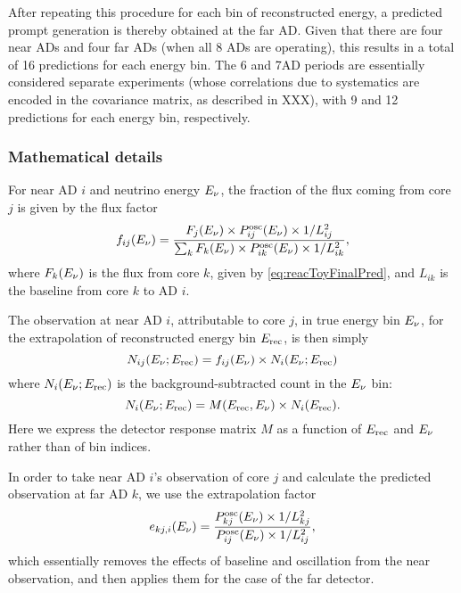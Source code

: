 \documentclass[../thesis.tex]{subfiles}
\begin{document}
After repeating this procedure for each bin of reconstructed energy, a predicted prompt generation is thereby obtained at the far AD. Given that there are four near ADs and four far ADs (when all 8 ADs are operating), this results in a total of 16 predictions for each energy bin. The 6 and 7AD periods are essentially considered separate experiments (whose correlations due to systematics are encoded in the covariance matrix, as described in XXX), with 9 and 12 predictions for each energy bin, respectively.

\subsubsection{Mathematical details}

For near AD $i$ and neutrino energy $E_\mathrm{\nu}$, the fraction of the flux coming from core $j$ is given by the flux factor
\begin{equation*}
  f_{ij}(E_\mathrm{\nu}) = \frac{F_j(E_\mathrm{\nu}) \times P^{\mathrm{osc}}_{ij}(E_\mathrm{\nu}) \times 1/L^2_{ij}}
  {\sum_k F_k(E_\mathrm{\nu}) \times P^{\mathrm{osc}}_{ik}(E_\mathrm{\nu}) \times 1/L^2_{ik}},
\end{equation*}
where $F_k(E_\mathrm{\nu})$ is the flux from core $k$, given by \autoref{eq:reacToyFinalPred}, and $L_{ik}$ is the baseline from core $k$ to AD $i$.

The observation at near AD $i$, attributable to core $j$, in true energy bin $E_\mathrm{\nu}$, for the extrapolation of reconstructed energy bin $E_\mathrm{rec}$, is then simply
\begin{equation*}
  N_{ij}(E_\mathrm{\nu}; E_\mathrm{rec}) = f_{ij}(E_\mathrm{\nu}) \times N_i(E_\mathrm{\nu}; E_\mathrm{rec})
\end{equation*}
where $N_i(E_\mathrm{\nu}; E_\mathrm{rec})$ is the background-subtracted count in the $E_\mathrm{\nu}$ bin:
\begin{equation*}
  N_i(E_\mathrm{\nu}; E_\mathrm{rec}) = M(E_\mathrm{rec}, E_\mathrm{\nu}) \times N_i(E_\mathrm{rec}).
\end{equation*}
Here we express the detector response matrix $M$ as a function of $E_\mathrm{rec}$ and $E_\mathrm{\nu}$ rather than of bin indices.

In order to take near AD $i$'s observation of core $j$ and calculate the predicted observation at far AD $k$, we use the extrapolation factor
\begin{equation*}
  e_{kj,i}(E_\mathrm{\nu}) = \frac{P^{\mathrm{osc}}_{kj}(E_\mathrm{\nu}) \times 1/L^2_{kj}}
  {P^{\mathrm{osc}}_{ij}(E_\mathrm{\nu}) \times 1/L^2_{ij}},
\end{equation*}
which essentially removes the effects of baseline and oscillation from the near observation, and then applies them for the case of the far detector.
\end{document}
